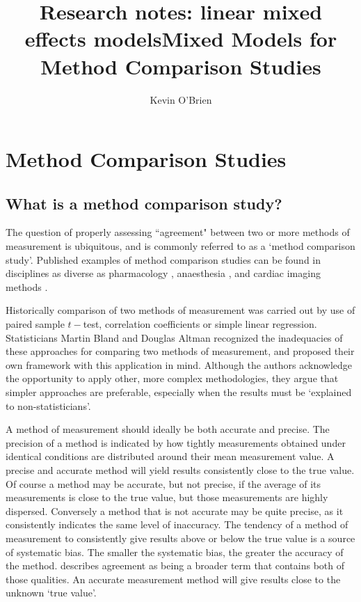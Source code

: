 \documentclass[12pt, a4paper]{report}
\title{Research notes: linear mixed effects models}
\author{ } \date{ }
\theoremstyle{plain}
\theoremstyle{definition}
\theoremstyle{remark}
\begin{document}
	\author{Kevin O'Brien}
	\title{Mixed Models for Method Comparison Studies}
	\tableofcontents
	
	\newpage
	\chapter{Method Comparison Studies}
	
	
	\section{What is a method comparison study?}


The question of properly assessing ``agreement" between two or more methods of measurement is ubiquitous, and is commonly referred to as a `method comparison study'. Published examples of method comparison studies can be found in disciplines
as diverse as pharmacology \citep{ludbrook97}, anaesthesia \citep{Myles}, and cardiac imaging methods \citep{Krumm}.
	
Historically comparison of two methods of measurement was carried out by use of paired sample $t-$test, correlation coefficients or simple linear regression. Statisticians Martin Bland and Douglas Altman recognized the inadequacies of these approaches for comparing two methods of measurement, and proposed their own framework with this application in mind. Although the authors acknowledge the opportunity to apply other, more complex methodologies, they argue that simpler approaches are preferable, especially when the results must be `explained to non-statisticians'.


A method of measurement should ideally be both accurate and
precise. The precision of a method is indicated by how tightly
measurements obtained under identical conditions are distributed
around their mean measurement value. A precise and accurate method
will yield results consistently close to the true value. Of course
a method may be accurate, but not precise, if the average of its
measurements is close to the true value, but those measurements
are highly dispersed. Conversely a method that is not accurate may
be quite precise, as it consistently indicates the same level of
inaccuracy. The tendency of a method of measurement to
consistently give results above or below the true value is a
source of systematic bias. The smaller the systematic bias, the
greater the accuracy of the method. \citet{Barnhart} describes agreement as being a broader
term that contains both of those qualities. An accurate
measurement method will give results close to the unknown `true
value'.
\end{document}
